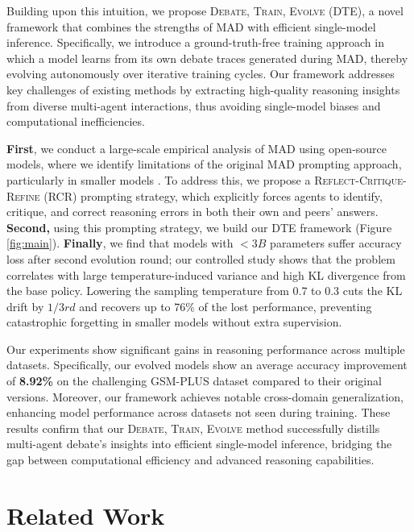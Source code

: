 \documentclass[11pt]{article}
\begin{document}
Building upon this intuition, we propose \textsc{Debate, Train, Evolve (DTE)}, a novel framework that combines the strengths of MAD with efficient single-model inference. Specifically, we introduce a ground-truth-free training approach in which a model learns from its own debate traces generated during MAD, thereby evolving autonomously over iterative training cycles. Our framework addresses key challenges of existing methods by extracting high-quality reasoning insights from diverse multi-agent interactions, thus avoiding single-model biases and computational inefficiencies.

\textbf{First}, we conduct a large-scale empirical analysis of MAD using open-source models, where we identify limitations of the original MAD prompting approach, particularly in smaller models \cite{du2023improving}. To address this, we propose a \textsc{Reflect-Critique-Refine (RCR)} prompting strategy, which explicitly forces agents to identify, critique, and correct reasoning errors in both their own and peers' answers. \textbf{Second,} using this prompting strategy, we build our \textsc{DTE} framework (Figure \ref{fig:main}). \textbf{Finally}, we find that models with $<3B$ parameters suffer accuracy loss \cite{srivastava2025towards} after second evolution round; our controlled study shows that the problem correlates with large temperature-induced variance and high KL divergence from the base policy. Lowering the sampling temperature from 0.7 to 0.3 cuts the KL drift by $1/3rd$ and recovers up to 76\% of the lost performance, preventing catastrophic forgetting in smaller models without extra supervision.

Our experiments show significant gains in reasoning performance across multiple datasets. Specifically, our evolved models show an average accuracy improvement of \textbf{8.92\%} on the challenging GSM-PLUS dataset compared to their original versions. Moreover, our framework achieves notable cross-domain generalization, enhancing model performance across datasets not seen during training. These results confirm that our \textsc{Debate, Train, Evolve} method successfully distills multi-agent debate's insights into efficient single-model inference, bridging the gap between computational efficiency and advanced reasoning capabilities.



\section{Related Work}
\label{sec:related_work}
\end{document}
